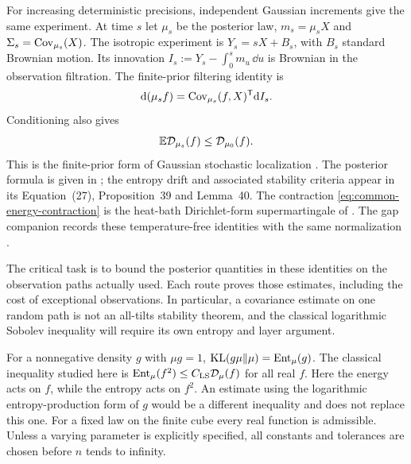 For increasing deterministic precisions, independent Gaussian increments
give the same experiment. At time $s$ let $\mu_s$ be the posterior law,
$m_s=\mu_s X$ and $\Sigma_s=\operatorname{Cov}_{\mu_s}(X)$. The isotropic experiment
is $Y_s=sX+B_s$, with $B_s$ standard Brownian motion. Its innovation
$I_s:=Y_s-\int_0^s m_u\,\dd u$ is Brownian in the observation filtration.
The finite-prior filtering identity is
\begin{equation}\label{eq:common-filtering}
 \mathrm d(\mu_s f)=\operatorname{Cov}_{\mu_s}(f,X)^{\mathsf T}\mathrm d I_s.
\end{equation}
Conditioning also gives
\begin{equation}\label{eq:common-energy-contraction}
 \mathbb E\mathcal D_{\mu_s}(f)\le\mathcal D_{\mu_0}(f).
\end{equation}
This is the finite-prior form of Gaussian stochastic localization
\cite{Eldan2013StochasticLocalization}. The posterior formula is given
in \cite[Section~2.4.2, Fact~14 and Equation~(6), arXiv version~2]{ChenEldan2025Localization};
the entropy drift and associated stability criteria appear in its
Equation~(27), Proposition~39 and Lemma~40. The contraction
\eqref{eq:common-energy-contraction} is the heat-bath Dirichlet-form
supermartingale of
\cite[Lemma~9, arXiv version~2]{EldanKoehlerZeitouni2022}.
The gap companion records these temperature-free identities with the
same normalization \cite[Section~2]{AcceptedGap}.

The critical task is to bound the posterior quantities in these
identities on the observation paths actually used. Each route proves
those estimates, including the cost of exceptional observations. In
particular, a covariance estimate on one random path is not an
all-tilts stability theorem, and the classical logarithmic Sobolev
inequality will require its own entropy and layer argument.

For a nonnegative density $g$ with $\mu g=1$, $\operatorname{KL}(g\mu\Vert\mu)
=\operatorname{Ent}_\mu(g)$. The classical inequality studied here is
$\operatorname{Ent}_\mu(f^2)\le C_{\mathrm{LS}}\mathcal D_\mu(f)$ for all real $f$.
Here the energy acts on $f$, while the entropy acts on $f^2$.
An estimate using the logarithmic entropy-production form of $g$ would
be a different inequality and does not replace this one.
For a fixed law on the finite cube every real function is admissible.
Unless a varying parameter is explicitly specified, all constants and
tolerances are chosen before $n$ tends to infinity.
